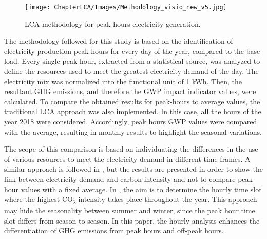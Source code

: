 

\begin{figure}[]
	\centering
	\texttt{[image: ChapterLCA/Images/Methodology\_visio\_new\_v5.jpg]}
		\caption{LCA methodology for peak hours electricity generation.}%
	\label{Methodology}
\end{figure}


{The methodology followed for this study is based on the identification of electricity production peak hours for every day of the year, compared to the base load.} Every single peak hour, {extracted from a statistical source}, was analyzed to define the resources used to meet the greatest electricity demand of the day. The electricity mix was normalized into the functional unit of 1 kWh. Then, the resultant GHG emissions, and therefore the GWP impact indicator values, were calculated. To compare the obtained results for peak-hours to average values, the traditional LCA approach was also implemented. In this case, all the hours of the year 2018 were considered. Accordingly, peak hours GWP values were compared with the average, resulting in monthly results to highlight the seasonal variations. 

{The scope of this comparison is based on individuating the differences in the use of various resources to meet the electricity demand in different time frames}.  A similar approach is followed in \cite{Khan2018, Khan2018AnalysisIntensity, Cubi2015IncorporationAssessment}, but the results are presented in order to show the link between electricity demand and carbon intensity and not to compare peak hour values with a fixed average. In \cite{Nilsson2017AssessingEmissions}, the aim is to determine the hourly time slot where the highest CO\textsubscript2 intensity takes place throughout the year. This approach may hide the seasonality between summer and winter, since the peak hour time slot differs from season to season. In this paper, the hourly analysis enhances the differentiation of GHG emissions from peak hours and off-peak hours. 


